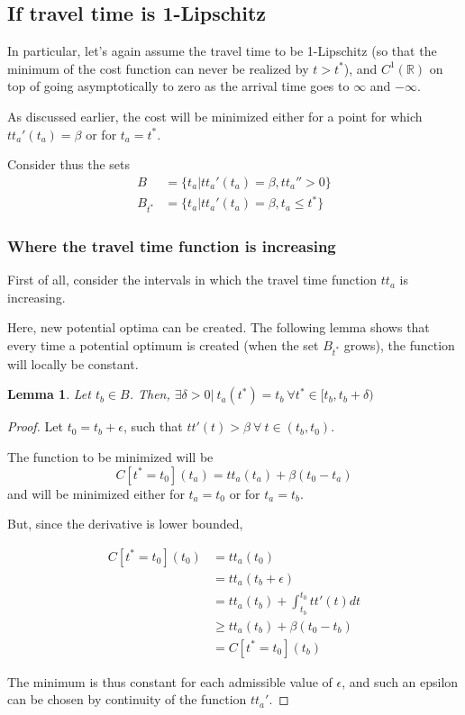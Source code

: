 \documentclass{article}
\newtheorem{lemma}[theorem]{Lemma}
\begin{document}
\subsection{If travel time is 1-Lipschitz}

In particular, let's again assume the travel time to be 1-Lipschitz (so that the minimum of the cost function can never be realized by \(t > t^*\)), and \(C^1(\mathbb{R})\)
on top of going asymptotically to zero as the arrival time goes to \(\infty\) and \(-\infty\).

As discussed earlier, the cost will be minimized either for a point for which \(tt_a'(t_a) = \beta\) or for \(t_a = t^*\).

Consider thus the sets
\begin{align*}
  B & = \{t_a | tt_a'(t_a) = \beta, tt_a'' > 0\} \\
  B_{t^*}&  = \{t_a | tt_a'(t_a) = \beta, t_a \leq t^*\}
\end{align*}

\subsubsection{Where the travel time function is increasing}

First of all, consider the intervals in which the travel time function \(tt_a\) is increasing.

Here, new potential optima can be created.
The following lemma shows that every time a potential optimum is created (when the set \(B_{t^*} \) grows), the function will locally be constant.

\begin{lemma}
  Let \(t_b \in B\). Then, \(\exists \delta > 0 |\ t_a(t^*) = t_b \ \forall t^* \in [t_b, t_b + \delta)\)
\end{lemma}
\begin{proof}
  Let \(t_0 = t_b + \epsilon\), such that \(tt'(t) > \beta\ \forall\ t \in (t_b, t_0)\).

  The function to be minimized will be
  \begin{equation*}
    C[t^* = t_0](t_a) = tt_a(t_a) + \beta(t_0 - t_a)
  \end{equation*}
  and will be minimized either for \(t_a = t_0\) or for \(t_a = t_b\).

  But, since the derivative is lower bounded,

  \begin{align*}
    C[t^*=t_0](t_0) & = tt_a(t_0) \\
    & = tt_a(t_b + \epsilon) \\
    & = tt_a(t_b) + \int_{t_b}^{t_0} tt'(t) dt \\
    & \geq tt_a(t_b) + \beta(t_0 - t_b) \\
    & = C[t^* = t_0](t_b)
  \end{align*}

  The minimum is thus constant for each admissible value of \(\epsilon\), and such an epsilon can be chosen by continuity of the function \(tt_a'\).
\end{proof}
\end{document}
